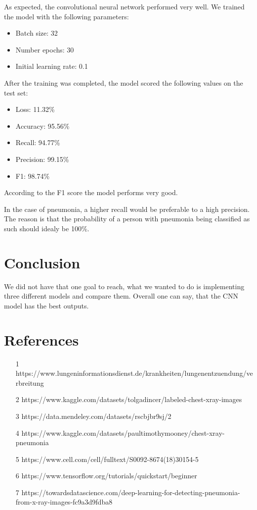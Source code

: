\documentclass{article}
\begin{document}
As expected, the convolutional neural network performed very well.
We trained the model with the following parameters:
\begin{itemize}
  \item Batch size: 32
  \item Number epochs: 30
  \item Initial learning rate: 0.1
\end{itemize}

After the training was completed, the model scored the following values on the test set:

\begin{itemize}
  \item Loss: 11.32\%
  \item Accuracy: 95.56\%
  \item Recall: 94.77\%
  \item Precision: 99.15\%
  \item F1: 98.74\%
\end{itemize}

According to the F1 score the model performs very good. 

In the case of pneumonia, a higher recall would be preferable to a high precision. 
The reason is that the probability of a person with pneumonia being classified as such should idealy be 100\%.

\section{Conclusion}

We did not have that one goal to reach, what we wanted to do is implementing three different models and compare them. 
Overall one can say, that the CNN model has the best outputs. 

\section{References}
\begin{enumerate}
  \item [1] https://www.lungeninformationsdienst.de/krankheiten/lungenentzuendung/verbreitung
  \item [2] https://www.kaggle.com/datasets/tolgadincer/labeled-chest-xray-images
  \item [3] https://data.mendeley.com/datasets/rscbjbr9sj/2
  \item [4] https://www.kaggle.com/datasets/paultimothymooney/chest-xray-pneumonia
  \item [5] https://www.cell.com/cell/fulltext/S0092-8674(18)30154-5
  \item [6] https://www.tensorflow.org/tutorials/quickstart/beginner
  \item [7] https://towardsdatascience.com/deep-learning-for-detecting-pneumonia-from-x-ray-images-fc9a3d9fdba8
\end{enumerate}
\end{document}
